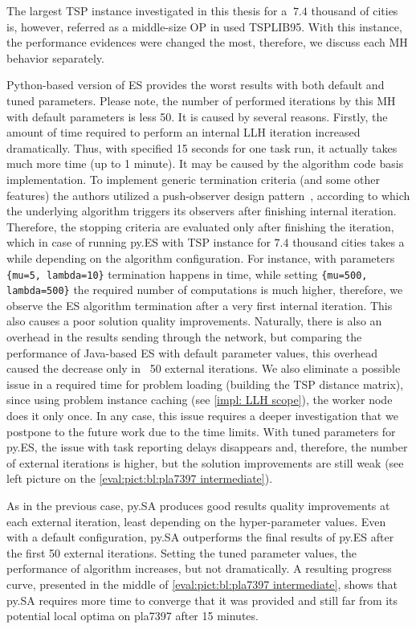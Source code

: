 The largest TSP instance investigated in this thesis for a $~7.4$ thousand of cities is, however, referred as a middle-size OP in used TSPLIB95. With this instance, the performance evidences were changed the most, therefore, we discuss each MH behavior separately.

Python-based version of ES provides the worst results with both default and tuned parameters. Please note, the number of performed iterations by this MH with default parameters is less 50. It is caused by several reasons. Firstly, the amount of time required to perform an internal LLH iteration increased dramatically. Thus, with specified 15 seconds for one task run, it actually takes much more time (up to 1 minute). It may be caused by the algorithm code basis implementation. To implement generic termination criteria (and some other features) the authors utilized a push-observer design pattern~\cite{benitez2019jmetalpy}, according to which the underlying algorithm triggers its observers after finishing internal iteration. Therefore, the stopping criteria are evaluated only after finishing the iteration, which in case of running py.ES with TSP instance for $7.4$ thousand cities takes a while depending on the algorithm configuration. For instance, with parameters \texttt{\{mu=5, lambda=10\}} termination happens in time, while setting \texttt{\{mu=500, lambda=500\}} the required number of computations is much higher, therefore, we observe the ES algorithm termination after a very first internal iteration. This also causes a poor solution quality improvements. Naturally, there is also an overhead in the results sending through the network, but comparing the performance of Java-based ES with default parameter values, this overhead caused the decrease only in ~50 external iterations. We also eliminate a possible issue in a required time for problem loading (building the TSP distance matrix), since using problem instance caching (see \cref{impl: LLH scope}), the worker node does it only once. In any case, this issue requires a deeper investigation that we postpone to the future work due to the time limits. With tuned parameters for py.ES, the issue with task reporting delays disappears and, therefore, the number of external iterations is higher, but the solution improvements are still weak (see left picture on the \cref{eval:pict:bl:pla7397 intermediate}).

As in the previous case, py.SA produces good results quality improvements at each external iteration, least depending on the hyper-parameter values. Even with a default configuration, py.SA outperforms the final results of py.ES after the first 50 external iterations. Setting the tuned parameter values, the performance of algorithm increases, but not dramatically. A resulting progress curve, presented in the middle of \cref{eval:pict:bl:pla7397 intermediate}, shows that py.SA requires more time to converge that it was provided and still far from its potential local optima on pla7397 after 15 minutes.


